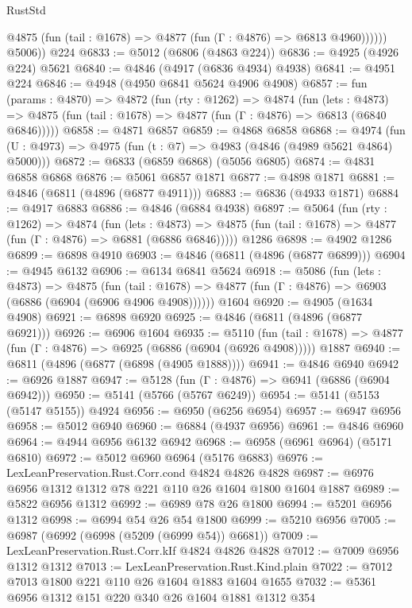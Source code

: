 \begin{lexlean}{RustStd}
\begin{coremodule}
              @4875 (fun (tail : @1678) => @4877 (fun (Γ : @4876) => @6813 @4960))))))
        @5006))
    @224
@6833 := @5012 (@6806 (@4863 @224))
@6836 := @4925 (@4926 @224) @5621
@6840 := @4846 (@4917 (@6836 @4934) @4938)
@6841 := @4951 @224
@6846 := @4948 (@4950 @6841 @5624 @4906 @4908)
@6857 := fun (params : @4870) =>
  @4872
    (fun (rty : @1262) =>
    @4874
      (fun (lets : @4873) =>
      @4875 (fun (tail : @1678) => @4877 (fun (Γ : @4876) => @6813 (@6840 @6846)))))
@6858 := @4871 @6857
@6859 := @4868 @6858
@6868 := @4974 (fun (U : @4973) => @4975 (fun (t : @7) => @4983 (@4846 (@4989 @5621 @4864) @5000)))
@6872 := @6833 (@6859 @6868) (@5056 @6805)
@6874 := @4831 @6858 @6868
@6876 := @5061 @6857 @1871
@6877 := @4898 @1871
@6881 := @4846 (@6811 (@4896 (@6877 @4911)))
@6883 := @6836 (@4933 @1871)
@6884 := @4917 @6883
@6886 := @4846 (@6884 @4938)
@6897 := @5064
    (fun (rty : @1262) =>
    @4874
      (fun (lets : @4873) =>
      @4875 (fun (tail : @1678) => @4877 (fun (Γ : @4876) => @6881 (@6886 @6846)))))
    @1286
@6898 := @4902 @1286
@6899 := @6898 @4910
@6903 := @4846 (@6811 (@4896 (@6877 @6899)))
@6904 := @4945 @6132
@6906 := @6134 @6841 @5624
@6918 := @5086
    (fun (lets : @4873) =>
    @4875
      (fun (tail : @1678) => @4877 (fun (Γ : @4876) => @6903 (@6886 (@6904 (@6906 @4906 @4908))))))
    @1604
@6920 := @4905 (@1634 @4908)
@6921 := @6898 @6920
@6925 := @4846 (@6811 (@4896 (@6877 @6921)))
@6926 := @6906 @1604
@6935 := @5110
    (fun (tail : @1678) => @4877 (fun (Γ : @4876) => @6925 (@6886 (@6904 (@6926 @4908)))))
    @1887
@6940 := @6811 (@4896 (@6877 (@6898 (@4905 @1888))))
@6941 := @4846 @6940
@6942 := @6926 @1887
@6947 := @5128 (fun (Γ : @4876) => @6941 (@6886 (@6904 @6942)))
@6950 := @5141 (@5766 (@5767 @6249))
@6954 := @5141 (@5153 (@5147 @5155)) @4924
@6956 := @6950 (@6256 @6954)
@6957 := @6947 @6956
@6958 := @5012 @6940
@6960 := @6884 (@4937 @6956)
@6961 := @4846 @6960
@6964 := @4944 @6956 @6132 @6942
@6968 := @6958 (@6961 @6964) (@5171 @6810)
@6972 := @5012 @6960 @6964 (@5176 @6883)
@6976 := LexLeanPreservation.Rust.Corr.cond @4824 @4826 @4828
@6987 := @6976 @6956 @1312 @1312 @78 @221 @110 @26 @1604 @1800 @1604 @1887
@6989 := @5822 @6956 @1312
@6992 := @6989 @78 @26 @1800
@6994 := @5201 @6956 @1312
@6998 := @6994 @54 @26 @54 @1800
@6999 := @5210 @6956
@7005 := @6987 (@6992 (@6998 (@5209 (@6999 @54)) @6681))
@7009 := LexLeanPreservation.Rust.Corr.kIf @4824 @4826 @4828
@7012 := @7009 @6956 @1312 @1312
@7013 := LexLeanPreservation.Rust.Kind.plain
@7022 := @7012 @7013 @1800 @221 @110 @26 @1604 @1883 @1604 @1655
@7032 := @5361 @6956 @1312 @151 @220 @340 @26 @1604 @1881 @1312 @354

\end{coremodule}
\end{lexlean}

